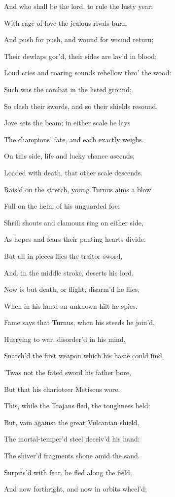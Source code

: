 And who shall be the lord, to rule the lusty year:

With rage of love the jealous rivals burn,

And push for push, and wound for wound return;

Their dewlaps gor’d, their sides are lav’d in blood;

Loud cries and roaring sounds rebellow thro’ the wood:

Such was the combat in the listed ground;

So clash their swords, and so their shields resound.

Jove sets the beam; in either scale he lays

The champions’ fate, and each exactly weighs.

On this side, life and lucky chance ascends;

Loaded with death, that other scale descends.

Rais’d on the stretch, young Turnus aims a blow

Full on the helm of his unguarded foe:

Shrill shouts and clamours ring on either side,

As hopes and fears their panting hearts divide.

But all in pieces flies the traitor sword,

And, in the middle stroke, deserts his lord.

Now is but death, or flight; disarm’d he flies,

When in his hand an unknown hilt he spies.

Fame says that Turnus, when his steeds he join’d,

Hurrying to war, disorder’d in his mind,

Snatch’d the first weapon which his haste could find.

’Twas not the fated sword his father bore,

But that his charioteer Metiscus wore.

This, while the Trojans fled, the toughness held;

But, vain against the great Vulcanian shield,

The mortal-temper’d steel deceiv’d his hand:

The shiver’d fragments shone amid the sand.

Surpris’d with fear, he fled along the field,

And now forthright, and now in orbits wheel’d;


